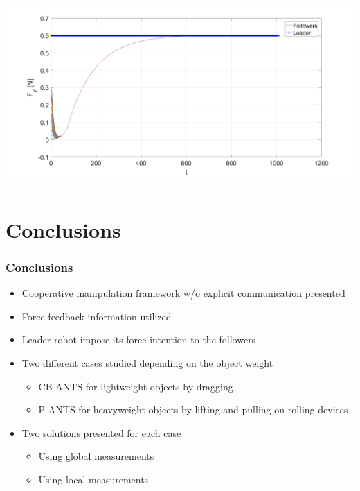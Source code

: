 \documentclass{beamer}
\begin{document}
\begin{frame}
\begin{columns}[c]
\centering
 \includegraphics[width=1\textwidth]{figures/P_ANTS_Local_Fy_100.png}
\end{columns}

\end{frame}


\section{Conclusions}
\begin{frame}
\frametitle{Conclusions}
\begin{itemize}
\item Cooperative manipulation framework w/o explicit communication presented\vspace{.2cm}
\item Force feedback information utilized \vspace{.2cm}
\item Leader robot impose its force intention to the followers \vspace{.2cm}
\item Two different cases studied depending on the object weight 
\begin{itemize}
\item CB-ANTS for lightweight objects by dragging
\item P-ANTS for heavyweight objects by lifting and pulling on rolling devices\vspace{.2cm}
\end{itemize}
\item Two solutions presented for each case
\begin{itemize}
\item Using global measurements
\item Using local measurements
\end{itemize}
\end{itemize}
\end{frame}
\end{document}
